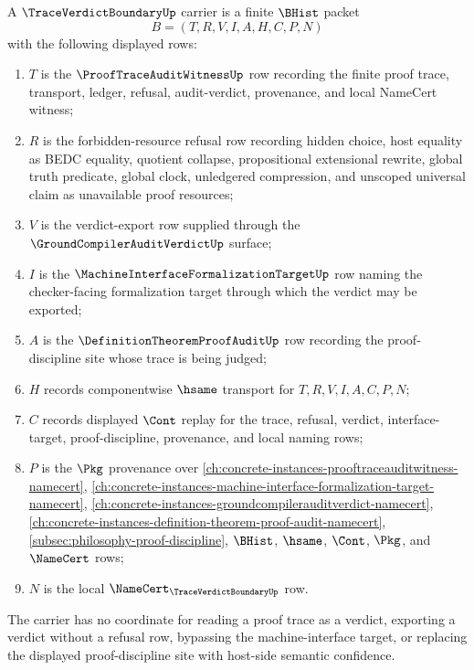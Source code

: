 \begin{definition}
\label{def:trace-verdict-boundary-carrier}
A $\TraceVerdictBoundaryUp$ carrier is a finite $\BHist$ packet
$$
B=(T,R,V,I,A,H,C,P,N)
$$
with the following displayed rows:
\begin{enumerate}
\item $T$ is the $\ProofTraceAuditWitnessUp$ row recording the finite proof trace, transport, ledger, refusal, audit-verdict, provenance, and local NameCert witness;
\item $R$ is the forbidden-resource refusal row recording hidden choice, host equality as BEDC equality, quotient collapse, propositional extensional rewrite, global truth predicate, global clock, unledgered compression, and unscoped universal claim as unavailable proof resources;
\item $V$ is the verdict-export row supplied through the $\GroundCompilerAuditVerdictUp$ surface;
\item $I$ is the $\MachineInterfaceFormalizationTargetUp$ row naming the checker-facing formalization target through which the verdict may be exported;
\item $A$ is the $\DefinitionTheoremProofAuditUp$ row recording the proof-discipline site whose trace is being judged;
\item $H$ records componentwise $\hsame$ transport for $T,R,V,I,A,C,P,N$;
\item $C$ records displayed $\Cont$ replay for the trace, refusal, verdict, interface-target, proof-discipline, provenance, and local naming rows;
\item $P$ is the $\Pkg$ provenance over \autoref{ch:concrete-instances-prooftraceauditwitness-namecert}, \autoref{ch:concrete-instances-machine-interface-formalization-target-namecert}, \autoref{ch:concrete-instances-groundcompilerauditverdict-namecert}, \autoref{ch:concrete-instances-definition-theorem-proof-audit-namecert}, \autoref{subsec:philosophy-proof-discipline}, $\BHist$, $\hsame$, $\Cont$, $\Pkg$, and $\NameCert$ rows;
\item $N$ is the local $\NameCert_{\TraceVerdictBoundaryUp}$ row.
\end{enumerate}
The carrier has no coordinate for reading a proof trace as a verdict, exporting a verdict without a refusal row, bypassing the machine-interface target, or replacing the displayed proof-discipline site with host-side semantic confidence.
\end{definition}

